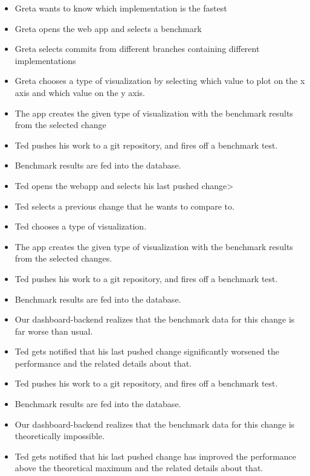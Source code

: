\begin{itemize}
	\item Greta wants to know which implementation is the fastest
	\item Greta opens the web app and selects a benchmark
	\item Greta selects commits from different branches containing different implementations
	\item Greta chooses a type of visualization by selecting which value to plot on the x axis and which value on the y axis.
	\item The app creates the given type of visualization with the benchmark results from the selected change
\end{itemize}

\begin{itemize}
	\item Ted pushes his work to a git repository, and fires off a benchmark test.
	\item Benchmark results are fed into the database.
	\item Ted opens the webapp and selects his last pushed change>
	\item Ted selects a previous change that he wants to compare to.
	\item Ted chooses a type of visualization.
	\item The app creates the given type of visualization with the benchmark results from the selected changes.
\end{itemize}

\begin{itemize}
	\item Ted pushes his work to a git repository, and fires off a benchmark test.
	\item Benchmark results are fed into the database.
	\item Our dashboard-backend realizes that the benchmark data for this change is far worse than usual.
	\item Ted gets notified that his last pushed change significantly worsened the performance and the related details about that.
\end{itemize}

\begin{itemize}
	\item Ted pushes his work to a git repository, and fires off a benchmark test.
	\item Benchmark results are fed into the database.
	\item Our dashboard-backend realizes that the benchmark data for this change is theoretically impossible.
	\item Ted gets notified that his last pushed change has improved the performance above the theoretical maximum and the related details about that.
\end{itemize}

